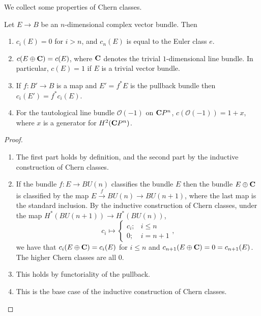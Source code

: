 \documentclass[a4paper,openany]{scrbook}
\begin{document}
We collect some properties of Chern classes.
\begin{lemma}\label{lemma:chernclassprops}
Let $E \to B$ be an $n$-dimensional complex vector bundle. Then
\begin{enumerate}
	\item $c_i(E) = 0$ for $i>n$, and $c_n(E)$ is equal to the Euler class $e$.
	\item $c(E \oplus \mathbf C) = c(E)$, where $\mathbf C$ denotes the trivial $1$-dimensional line bundle. In particular, $c(E)=1$ if $E$ is a trivial vector bundle.
	\item If $f\colon B' \to B$ is a map and $E'=f^*E$ is the pullback bundle then $c_i(E')=f^*c_i(E)$.
	\item For the tautological line bundle $\mathcal O(-1)$ on $\mathbf C P^n$, $c(\mathcal O(-1)) = 1+x$, where $x$ is a generator for $H^2(\mathbf C P^n)$.
\end{enumerate}
\end{lemma}
\begin{proof}
\begin{enumerate}
\item The first part holds by definition, and the second part by the inductive construction of Chern classes.
\item If the bundle  $f\colon E \to BU(n)$ classifies the bundle $E$ then the bundle $E \oplus \mathbf C$ is classified by the map $E \xrightarrow{f} BU(n) \to BU(n+1)$, where the last map is the standard inclusion. By the inductive construction of Chern classes,  under the map $H^*(BU(n+1)) \to H^*(BU(n))$,
\[
c_i \mapsto \begin{cases} c_i;& i \leq n\\
0;& i=n+1\end{cases},
\]
we have that $c_i(E \oplus \mathbf C) = c_i(E)$ for $i \leq n$ and $c_{n+1}(E \oplus \mathbf C) = 0 = c_{n+1}(E)$. The higher Chern classes are all $0$.
\item This holds by functoriality of the pullback.
\item This is the base case of the inductive construction of Chern classes.
\end{enumerate}
\end{proof}
\end{document}
